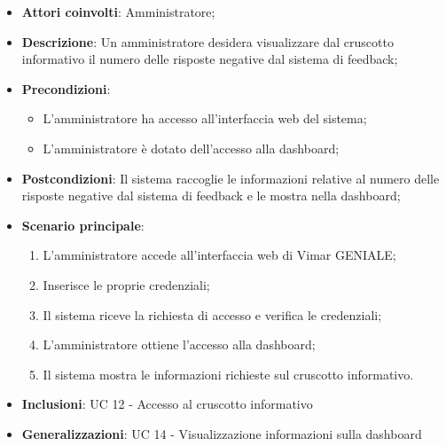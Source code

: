 \begin{itemize}
    \item \textbf{Attori coinvolti}: Amministratore;
    \item \textbf{Descrizione}: Un amministratore desidera visualizzare dal cruscotto informativo il numero delle risposte negative dal sistema di feedback;
    \item \textbf{Precondizioni}: 
        \begin{itemize}
            \item L’amministratore ha accesso all’interfaccia web del sistema;
            \item L’amministratore è dotato dell’accesso alla dashboard;
        \end{itemize}
    \item \textbf{Postcondizioni}: Il sistema raccoglie le informazioni relative al numero delle risposte negative dal sistema di feedback e le mostra nella dashboard;
    \item \textbf{Scenario principale}:
    \begin{enumerate}
    \item L’amministratore accede all’interfaccia web di Vimar GENIALE;
    \item Inserisce le proprie credenziali;
    \item Il sistema riceve la richiesta di accesso e verifica le credenziali;
    \item L’amministratore ottiene l’accesso alla dashboard;
    \item Il sistema mostra le informazioni richieste sul cruscotto informativo.
    \end{enumerate}
    \item \textbf{Inclusioni}: UC 12 - Accesso al cruscotto informativo
    \item \textbf{Generalizzazioni}: UC 14 - Visualizzazione informazioni sulla dashboard
\end{itemize}

